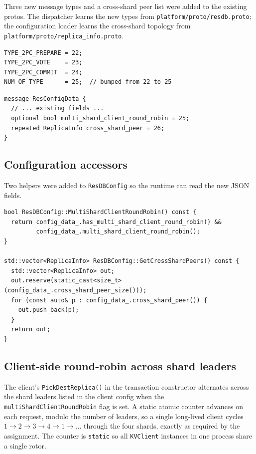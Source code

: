 \documentclass[11pt]{article}
\begin{document}
Three new message types and a cross-shard peer list were added to the
existing protos. The dispatcher learns the new types from
\texttt{platform/proto/resdb.proto}; the configuration loader learns the
cross-shard topology from \texttt{platform/proto/replica\_info.proto}.

\begin{lstlisting}[style=cppstyle,caption={\texttt{platform/proto/resdb.proto} -- new request types added to \texttt{Request::Type}.}]
TYPE_2PC_PREPARE = 22;
TYPE_2PC_VOTE    = 23;
TYPE_2PC_COMMIT  = 24;
NUM_OF_TYPE      = 25;  // bumped from 22 to 25
\end{lstlisting}

\begin{lstlisting}[style=cppstyle,caption={\texttt{platform/proto/replica\_info.proto} -- cross-shard topology and client round-robin flag added to \texttt{ResConfigData}.}]
message ResConfigData {
  // ... existing fields ...
  optional bool multi_shard_client_round_robin = 25;
  repeated ReplicaInfo cross_shard_peer = 26;
}
\end{lstlisting}

\subsection{Configuration accessors}

Two helpers were added to \texttt{ResDBConfig} so the runtime can read the
new JSON fields.

\begin{lstlisting}[style=cppstyle,caption={\texttt{platform/config/resdb\_config.cpp} -- new accessors for the 2PC topology and round-robin policy.}]
bool ResDBConfig::MultiShardClientRoundRobin() const {
  return config_data_.has_multi_shard_client_round_robin() &&
         config_data_.multi_shard_client_round_robin();
}

std::vector<ReplicaInfo> ResDBConfig::GetCrossShardPeers() const {
  std::vector<ReplicaInfo> out;
  out.reserve(static_cast<size_t>(config_data_.cross_shard_peer_size()));
  for (const auto& p : config_data_.cross_shard_peer()) {
    out.push_back(p);
  }
  return out;
}
\end{lstlisting}

\subsection{Client-side round-robin across shard leaders}

The client's \texttt{PickDestReplica()} in the transaction constructor
alternates across the shard leaders listed in the client config when
the \texttt{multiShardClientRoundRobin} flag is set. A static atomic
counter advances on each request, modulo the number of leaders, so a
single long-lived client cycles
$1 \rightarrow 2 \rightarrow 3 \rightarrow 4 \rightarrow 1 \rightarrow \ldots$
through the four shards, exactly as required by the assignment. The
counter is \texttt{static} so all \texttt{KVClient} instances in one
process share a single rotor.
\end{document}
